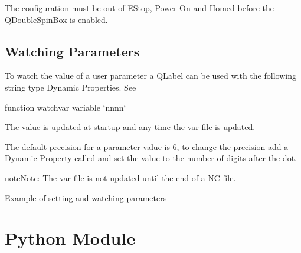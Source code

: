 \documentclass[letterpaper,10pt,english]{sphinxmanual}
\begin{document}
\sphinxAtStartPar
The configuration must be out of E\sphinxhyphen{}Stop, Power On and Homed before the
QDoubleSpinBox is enabled.


\section{Watching Parameters}
\label{\detokenize{parameters:watching-parameters}}
\sphinxAtStartPar
To watch the value of a user parameter a QLabel can be used with the following
string type Dynamic Properties. See {\hyperref[\detokenize{property::doc}]{}}

\begin{sphinxVerbatim}[commandchars=\\\{\}]
function watch\PYGZus{}var
variable `nnnn`
\end{sphinxVerbatim}


\sphinxAtStartPar
The value is updated at startup and any time the var file is updated.

\sphinxAtStartPar
The default precision for a parameter value is 6, to change the precision add a
Dynamic Property called  and set the value to the number of digits
after the dot.


\begin{sphinxadmonition}{note}{Note:}
\sphinxAtStartPar
The var file is not updated until the end of a NC file.
\end{sphinxadmonition}

\sphinxAtStartPar
Example of setting and watching parameters


\sphinxstepscope


\chapter{Python Module}
\label{\detokenize{python:python-module}}\label{\detokenize{python::doc}}
\sphinxAtStartPar
{}
\end{document}
